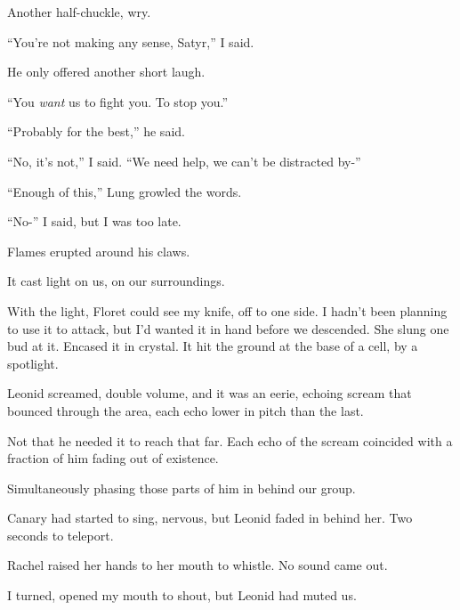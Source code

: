 Another half-chuckle, wry.



``You're not making any sense, Satyr,'' I said.



He only offered another short laugh.



``You \emph{want} us to fight you.  To stop you.''



``Probably for the best,'' he said.



``No, it's not,'' I said.  ``We need help, we can't be distracted by-''



``Enough of this,'' Lung growled the words.



``No-'' I said, but I was too late.



Flames erupted around his claws.



It cast light on us, on our surroundings.



With the light, Floret could see my knife, off to one side.  I hadn't been planning to use it to attack, but I'd wanted it in hand before we descended.  She slung one bud at it.  Encased it in crystal.  It hit the ground at the base of a cell, by a spotlight.



Leonid screamed, double volume, and it was an eerie, echoing scream that bounced through the area, each echo lower in pitch than the last.



Not that he needed it to reach that far.  Each echo of the scream coincided with a fraction of him fading out of existence.



Simultaneously phasing those parts of him in behind our group.



Canary had started to sing, nervous, but Leonid faded in behind her.  Two seconds to teleport.



Rachel raised her hands to her mouth to whistle.  No sound came out.



I turned, opened my mouth to shout, but Leonid had muted us.



